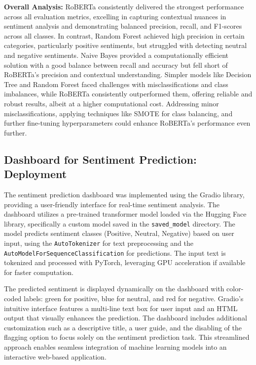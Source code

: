 \documentclass[journal]{IEEEtran}
\begin{document}
\textbf{Overall Analysis: }
RoBERTa consistently delivered the strongest performance across all evaluation metrics, excelling in capturing contextual nuances in sentiment analysis and demonstrating balanced precision, recall, and F1-scores across all classes. In contrast, Random Forest achieved high precision in certain categories, particularly positive sentiments, but struggled with detecting neutral and negative sentiments. Naive Bayes provided a computationally efficient solution with a good balance between recall and accuracy but fell short of RoBERTa’s precision and contextual understanding. Simpler models like Decision Tree and Random Forest faced challenges with misclassifications and class imbalances, while RoBERTa consistently outperformed them, offering reliable and robust results, albeit at a higher computational cost. Addressing minor misclassifications, applying techniques like SMOTE for class balancing, and further fine-tuning hyperparameters could enhance RoBERTa’s performance even further.


\subsection{\textbf{Dashboard for Sentiment Prediction: Deployment}}
The sentiment prediction dashboard was implemented using the Gradio library, providing a user-friendly interface for real-time sentiment analysis. The dashboard utilizes a pre-trained transformer model loaded via the Hugging Face library, specifically a custom model saved in the \texttt{saved\_model} directory. The model predicts sentiment classes (Positive, Neutral, Negative) based on user input, using the \texttt{AutoTokenizer} for text preprocessing and the \texttt{AutoModelForSequenceClassification} for predictions. The input text is tokenized and processed with PyTorch, leveraging GPU acceleration if available for faster computation. 

The predicted sentiment is displayed dynamically on the dashboard with color-coded labels: green for positive, blue for neutral, and red for negative. Gradio’s intuitive interface features a multi-line text box for user input and an HTML output that visually enhances the prediction. The dashboard includes additional customization such as a descriptive title, a user guide, and the disabling of the flagging option to focus solely on the sentiment prediction task. This streamlined approach enables seamless integration of machine learning models into an interactive web-based application.
\end{document}
